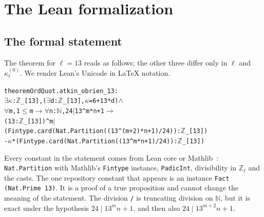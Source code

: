 \documentclass[11pt]{amsart}
\newcommand{\Zl}{\mathbb{Z}_\ell}
\newcommand{\lean}[1]{\texttt{#1}}
\theoremstyle{plain}
\theoremstyle{definition}
\numberwithin{equation}{section}
\begin{document}
\section{The Lean formalization}\label{sec:lean}

\subsection{The formal statement}
The theorem for $\ell=13$ reads as follows; the other three differ only in $\ell$ and $\kappa^{(0)}_\ell$. We render
Lean's Unicode in \LaTeX{} notation.
\begin{alltt}\small
theorem OrdQuot.atkin_obrien_13 :
    \(\exists\) \(\kappa\) : \(\mathbb{Z}\)_[13], (\(\exists\) d : \(\mathbb{Z}\)_[13], \(\kappa\) = 6 + 13 * d) \(\wedge\)
      \(\forall\) m, 1 \(\le\) m \(\to\) \(\forall\) n : \(\mathbb{N}\), 24 \(\mid\) 13 ^ m * n + 1 \(\to\)
        (13 : \(\mathbb{Z}\)_[13]) ^ m \(\mid\)
          (Fintype.card (Nat.Partition ((13 ^ (m + 2) * n + 1) / 24)) : \(\mathbb{Z}\)_[13])
          - \(\kappa\) * (Fintype.card (Nat.Partition ((13 ^ m * n + 1) / 24)) : \(\mathbb{Z}\)_[13])
\end{alltt}
Every constant in the statement comes from Lean core or Mathlib~\cite{Mathlib2020}: \lean{Nat.Partition} with Mathlib's
\lean{Fintype} instance, \lean{PadicInt}, divisibility in $\Zl$ and the casts. The one repository constant that appears
is an instance \lean{Fact (Nat.Prime 13)}. It is a proof of a true proposition and cannot change the meaning of the
statement. The division \lean{/} is truncating division on $\mathbb N$, but it is exact under the hypothesis
$24\mid13^mn+1$, and then also $24\mid13^{m+2}n+1$.
\end{document}
